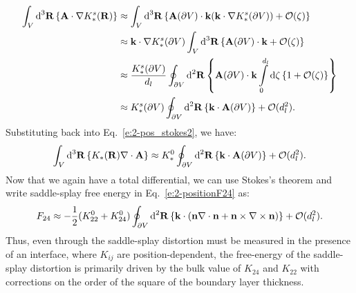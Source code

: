 \begin{align}
  \int_{V} \textup{d}^3\mathbf{R} \left \{ \mathbf{A} \cdot \nabla K_{*}^s (\mathbf{R}) \right \} & \approx
  \int_{V} \textup{d}^3\mathbf{R} \left \{\mathbf{A}(\partial V) \cdot \mathbf{k}(\mathbf{k} \cdot \nabla K_*^s(\partial V))  + \mathcal{O}(\zeta) \right \} \\ & \approx
  \mathbf{k} \cdot \nabla K_*^s(\partial V) \int_{V} \textup{d}^3\mathbf{R}\left \{\mathbf{A}(\partial V) \cdot \mathbf{k} + \mathcal{O}(\zeta) \right \} \\ & \approx
  \frac{K_*^s(\partial V)}{d_l} \oint_{\partial V} \textup{d}^2\mathbf{R}\left \{\mathbf{A}(\partial V) \cdot \mathbf{k} \int\limits_{0}^{d_l} \textup{d}\zeta \left \{ 1 + \mathcal{O}(\zeta) \right \}\right \} \\ & \approx
  K_*^s(\partial V) \oint_{\partial V} \textup{d}^2\mathbf{R}\left \{ \mathbf{k}  \cdot \mathbf{A}(\partial V) \right \} + \mathcal{O}(d_l^2).
\end{align}
Substituting back into Eq.~\ref{e:2-pos_stokes2}, we have:
\begin{equation}
  \int_{V}\textup{d}^3\mathbf{R} \left \{ K_{*} (\mathbf{R}) \nabla \cdot \mathbf{A} \right \} \approx
  K_*^0 \oint_{\partial V} \textup{d}^2\mathbf{R} \left \{ \mathbf{k} \cdot \mathbf{A}(\partial V)\right \} + \mathcal{O}(d_l^2).\label{e:2-positionF24}
\end{equation}
Now that we again have a total differential, we can use Stokes's theorem and write saddle-splay free energy in Eq.~\ref{e:2-positionF24} as:
\begin{equation}
  F_{24} \approx -\frac{1}{2}(K_{22}^0 + K_{24}^0)
  \oint_{\partial V}\textup{d}^2 \mathbf{R} \left \{\mathbf{k} \cdot (\mathbf{n} \nabla \cdot \mathbf{n} + \mathbf{n} \times \nabla \times \mathbf{n}) \right \} + \mathcal{O}(d_l^2). \label{e:2-positionF24_surf}
\end{equation}
Thus, even through the saddle-splay distortion must be measured in the presence of an interface, where $K_{ij}$ are position-dependent, the free-energy of the saddle-splay distortion is primarily driven by the bulk value of $K_{24}$ and $K_{22}$ with corrections on the order of the square of the boundary layer thickness.\\


